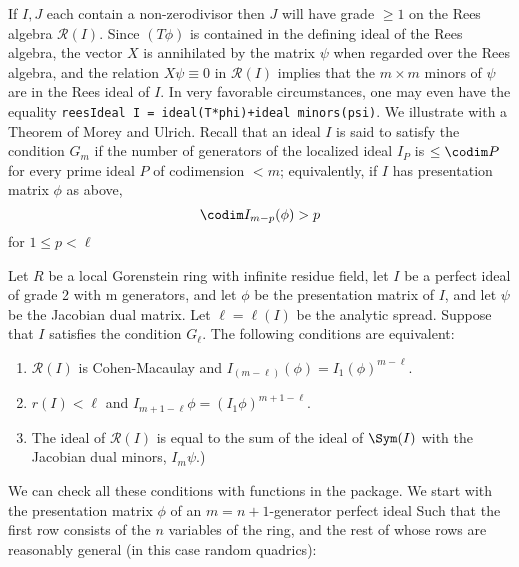 \documentclass[twoside,12pt, leqno]{amsart}
\def\RR{{\mathcal R}}
\begin{document}
     If $I,J$ each contain a non-zerodivisor then
     $J$ will have grade $\geq 1$ on the Rees algebra $\RR(I)$. Since $(T\phi)$ is contained in the
     defining ideal of the Rees algebra, the vector $X$ is annihilated by the matrix
     $\psi$ when regarded over the Rees algebra, and the relation
     $X\psi \equiv 0$ in $\RR(I)$ implies that the $m\times m$ minors of $\psi$ are
     in the Rees ideal of $I$. In very favorable circumstances,
     one may even have the equality 
     {\tt reesIdeal I = ideal(T*phi)+ideal minors(psi)}. We illustrate with a Theorem of
     Morey and Ulrich. Recall that an ideal $I$ is said to satisfy the condition
     $G_{m}$ if the number of generators of the localized ideal $I_{P}$ is $\leq \codim P$
     for every prime ideal $P$ of codimension $<m$; equivalently, if $I$ has  presentation
      matrix $\phi$ as above, 
     $$
     \codim I_{m-p}(\phi)>p
     $$
     for $1\leq p < \ell$
     
     
\begin{theorem}[\cite{MU}]
    Let $R$ be a local Gorenstein ring with infinite residue field, let $I$ be a perfect ideal
     of grade 2 with m generators, and let $\phi$ be the presentation matrix of $I$,
     and let $\psi$ be the Jacobian dual matrix. Let
     $\ell = \ell(I)$ be the analytic spread. Suppose that
     $I$ satisfies the condition $G_{\ell}$. The following conditions are equivalent:
 
\begin{enumerate}
     \item $\RR(I)$ is Cohen-Macaulay and $I_(m-\ell)(\phi) = I_1(\phi)^{m-\ell}$.
     \item $r(I) < \ell$ and $I_{m+1-\ell}\phi = (I_1\phi)^{m+1-\ell}$.
     \item The ideal of $\RR(I)$ is equal to the sum of the ideal
     of $\Sym(I)$ with the Jacobian dual minors, $I_{m}\psi$.)
\end{enumerate}
    
\end{theorem}

We can check all these conditions with functions in the package.      
     We start with the presentation matrix $\phi$ of an $m = n+1$-generator perfect ideal
     Such that the first row consists of the $n$
     variables of the ring, and the rest of whose rows are reasonably general (in this
     case random quadrics):
\end{document}
